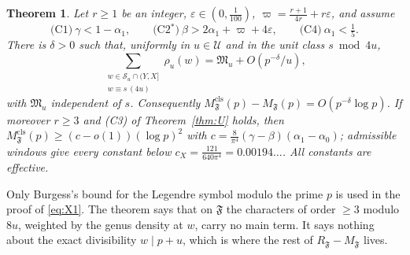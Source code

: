 \documentclass[11pt,reqno]{amsart}
\newtheorem{theorem}{Theorem}[section]
\theoremstyle{definition}
\newcommand{\eps}{\varepsilon}
\newcommand{\cF}{\mathfrak F}
\newcommand{\cS}{\mathcal S}
\newcommand{\cU}{\mathcal U}
\newcommand{\Mcls}{M^{\mathrm{cls}}}
\begin{document}
\begin{theorem}\label{thm:D}
Let $r\ge1$ be an integer, $\eps\in(0,\frac1{100})$,
$\varpi=\frac{r+1}{4r}+r\eps$, and assume
\[
 \text{(C1)}\ \gamma<1-\alpha_1,\qquad
 \text{(C2$^*$)}\ \beta>2\alpha_1+\varpi+4\eps,\qquad
 \text{(C4)}\ \alpha_1<\tfrac15 .
\]
There is $\delta>0$ such that, uniformly in $u\in\cU$ and in the unit
class $s\bmod 4u$,
\begin{equation}\label{eq:X1}
 \sum_{\substack{w\in\cS_u\cap(Y,X]\\ w\equiv s\,(4u)}}\rho_u(w)=\mathfrak M_u+O(p^{-\delta}/u),
\end{equation}
with $\mathfrak M_u$ independent of $s$.  Consequently
$\Mcls_\cF(p)-M_\cF(p)=O(p^{-\delta}\log p)$.  If moreover $r\ge3$ and (C3)
of Theorem~\ref{thm:U} holds, then
$\Mcls_\cF(p)\ge(c-o(1))(\log p)^2$ with
$c=\frac8{\pi^4}(\gamma-\beta)(\alpha_1-\alpha_0)$; admissible windows give
every constant below $c_X=\frac{121}{640\pi^4}=0.00194\ldots$.  All
constants are effective.
\end{theorem}

Only Burgess's bound for the Legendre symbol modulo the prime $p$ is used
in the proof of \eqref{eq:X1}.  The theorem says that on $\cF$ the
characters of order $\ge3$ modulo $8u$, weighted by the genus density at
$w$, carry no main term.  It says nothing about the exact divisibility
$w\mid p+u$, which is where the rest of $R_\cF-M_\cF$ lives.
\end{document}
